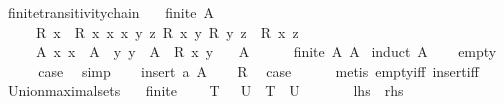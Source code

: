\begin{isabellebody}
\ finite{\isacharunderscore}transitivity{\isacharunderscore}chain{\isacharcolon}\isanewline
\ \ \ {\isachardoublequoteopen}finite\ A{\isachardoublequoteclose}\isanewline
\ \ \ \ \ R{\isacharcolon}\ {\isachardoublequoteopen}{\isasymAnd}x{\isachardot}\ {\isasymnot}\ R\ x\ x{\isachardoublequoteclose}\ {\isachardoublequoteopen}{\isasymAnd}x\ y\ z{\isachardot}\ {\isasymlbrakk}R\ x\ y{\isacharsemicolon}\ R\ y\ z{\isasymrbrakk}\ {\isasymLongrightarrow}\ R\ x\ z{\isachardoublequoteclose}\isanewline
\ \ \ \ \ A{\isacharcolon}\ {\isachardoublequoteopen}{\isasymAnd}x{\isachardot}\ x\ {\isasymin}\ A\ {\isasymLongrightarrow}\ {\isasymexists}y{\isachardot}\ y\ {\isasymin}\ A\ {\isasymand}\ R\ x\ y{\isachardoublequoteclose}\isanewline
\ \ \ {\isachardoublequoteopen}A\ {\isacharequal}\ {\isacharbraceleft}{\isacharbraceright}{\isachardoublequoteclose}\isanewline
%
\isadelimproof
\ \ %
\endisadelimproof
%
\isatagproof
{}\isamarkupfalse%
\ {\isacartoucheopen}finite\ A{\isacartoucheclose}\ A\isanewline
{}\isamarkupfalse%
\ {\isacharparenleft}induct\ A{\isacharparenright}\isanewline
\ \ \isamarkupfalse%
\ empty\isanewline
\ \ \isamarkupfalse%
\ \isamarkupfalse%
\ {\isacharquery}case\ \isamarkupfalse%
\ simp\isanewline
{}\isamarkupfalse%
\isanewline
\ \ \isamarkupfalse%
\ {\isacharparenleft}insert\ a\ A{\isacharparenright}\isanewline
\ \ \isamarkupfalse%
\ R\ \isamarkupfalse%
\ {\isacharquery}case\isanewline
\ \ \ \ \isamarkupfalse%
\ {\isacharparenleft}metis\ empty{\isacharunderscore}iff\ insert{\isacharunderscore}iff{\isacharparenright}\ \ \ \isanewline
{}\isamarkupfalse%
%
\endisatagproof
{\isafoldproof}%
%
\isadelimproof
\isanewline
%
\endisadelimproof
\isanewline
{}\isamarkupfalse%
\ Union{\isacharunderscore}maximal{\isacharunderscore}sets{\isacharcolon}\isanewline
\ \ \ {\isachardoublequoteopen}finite\ {\isasymF}{\isachardoublequoteclose}\isanewline
\ \ \ {\isachardoublequoteopen}{\isasymUnion}{\isacharbraceleft}T\ {\isasymin}\ {\isasymF}{\isachardot}\ {\isasymforall}U{\isasymin}{\isasymF}{\isachardot}\ {\isasymnot}\ T\ {\isasymsubset}\ U{\isacharbraceright}\ {\isacharequal}\ {\isasymUnion}{\isasymF}{\isachardoublequoteclose}\isanewline
\ \ \ \ {\isacharparenleft}\ {\isachardoublequoteopen}{\isacharquery}lhs\ {\isacharequal}\ {\isacharquery}rhs{\isachardoublequoteclose}{\isacharparenright}\isanewline

\end{isabellebody}
